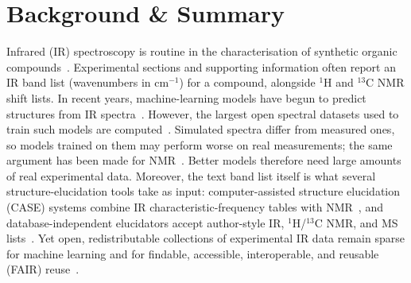 \documentclass[pdflatex,sn-nature]{sn-jnl}
\begin{document}

\maketitle

\section{Background \& Summary}\label{sec:background}

Infrared (IR) spectroscopy is routine in the characterisation of synthetic organic
compounds~\citep{silverstein2014sioc,blum2012atrftir}.
Experimental sections and supporting information often report an IR band list
(wavenumbers in cm$^{-1}$) for a compound, alongside $^{1}$H and $^{13}$C NMR shift lists.
In recent years, machine-learning models have begun to predict structures from IR
spectra~\citep{alberts2024irstruct,chacko2024spectro,sondhi2025jirvis}.
However, the largest open spectral datasets used to train such models are
computed~\citep{zipoli2025uspto,alberts2024multimodal,krishnadas2026squirl}.
Simulated spectra differ from measured ones, so models trained on them may perform
worse on real measurements; the same argument has been made for NMR~\citep{wang2025nmrexp}.
Better models therefore need large amounts of real experimental data.
Moreover, the text band list itself is what several structure-elucidation tools take
as input: computer-assisted structure elucidation (CASE) systems combine IR
characteristic-frequency tables with NMR~\citep{elyashberg2009case}, and
database-independent elucidators accept author-style IR, $^{1}$H/$^{13}$C NMR, and MS
lists~\citep{pesek2021elucidation}.
Yet open, redistributable collections of experimental IR data remain sparse for machine
learning and for findable, accessible, interoperable, and reusable (FAIR)
reuse~\citep{wilkinson2016fair}.
\end{document}
